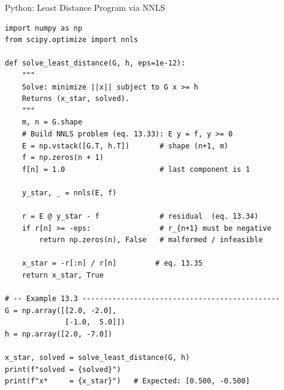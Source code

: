 \documentclass[aspectratio=169,10pt]{beamer}
\begin{document}
\begin{frame}[fragile]{Python: Least Distance Program via NNLS}
\begin{lstlisting}[caption={Algorithm 13.3 in Python using scipy.optimize.nnls}]
import numpy as np
from scipy.optimize import nnls

def solve_least_distance(G, h, eps=1e-12):
    """
    Solve: minimize ||x|| subject to G x >= h
    Returns (x_star, solved).
    """
    m, n = G.shape
    # Build NNLS problem (eq. 13.33): E y = f, y >= 0
    E = np.vstack([G.T, h.T])       # shape (n+1, m)
    f = np.zeros(n + 1)
    f[n] = 1.0                      # last component is 1

    y_star, _ = nnls(E, f)

    r = E @ y_star - f              # residual  (eq. 13.34)
    if r[n] >= -eps:                # r_{n+1} must be negative
        return np.zeros(n), False   # malformed / infeasible

    x_star = -r[:n] / r[n]         # eq. 13.35
    return x_star, True

# -- Example 13.3 ----------------------------------------------
G = np.array([[2.0, -2.0],
              [-1.0,  5.0]])
h = np.array([2.0, -7.0])

x_star, solved = solve_least_distance(G, h)
print(f"solved = {solved}")
print(f"x*     = {x_star}")   # Expected: [0.500, -0.500]
\end{lstlisting}
\end{frame}
\end{document}
